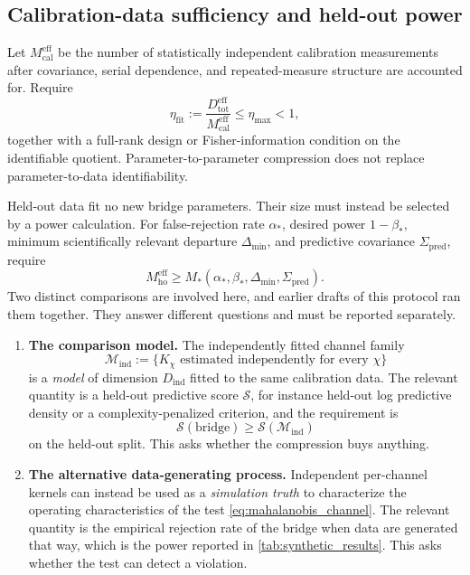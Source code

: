 \documentclass[11pt]{article}
\begin{document}
\subsection{Calibration-data sufficiency and held-out power}

Let \(M_{\mathrm{cal}}^{\mathrm{eff}}\) be the number of statistically independent calibration measurements after covariance, serial dependence, and repeated-measure structure are accounted for. Require
\begin{equation}
\eta_{\mathrm{fit}}
:=\frac{D_{\mathrm{tot}}^{\mathrm{eff}}}
        {M_{\mathrm{cal}}^{\mathrm{eff}}}
\le\eta_{\max}<1,
\label{eq:fit_ratio}
\end{equation}
together with a full-rank design or Fisher-information condition on the identifiable quotient. Parameter-to-parameter compression does not replace parameter-to-data identifiability.

Held-out data fit no new bridge parameters. Their size must instead be selected by a power calculation. For false-rejection rate \(\alpha_*\), desired power \(1-\beta_*\), minimum scientifically relevant departure \(\Delta_{\min}\), and predictive covariance \(\Sigma_{\mathrm{pred}}\), require
\begin{equation}
M_{\mathrm{ho}}^{\mathrm{eff}}
\ge
M_*(\alpha_*,\beta_*,\Delta_{\min},\Sigma_{\mathrm{pred}}).
\label{eq:power_requirement}
\end{equation}
Two distinct comparisons are involved here, and earlier drafts of this protocol ran them together. They answer different questions and must be reported separately.

\begin{enumerate}[leftmargin=1.55em]
\item \textbf{The comparison model.} The independently fitted channel family
\begin{equation}
\mathcal M_{\mathrm{ind}}
:=\{K_{\chi}\text{ estimated independently for every }\chi\}
\label{eq:independent_null}
\end{equation}
is a \emph{model} of dimension \(D_{\mathrm{ind}}\) fitted to the same calibration data. The relevant quantity is a held-out predictive score \(\mathcal S\), for instance held-out log predictive density or a complexity-penalized criterion, and the requirement is
\begin{equation}
\mathcal S\!\left(\text{bridge}\right)
\ge
\mathcal S\!\left(\mathcal M_{\mathrm{ind}}\right)
\label{eq:predictive_comparison}
\end{equation}
on the held-out split. This asks whether the compression buys anything.
\item \textbf{The alternative data-generating process.} Independent per-channel kernels can instead be used as a \emph{simulation truth} to characterize the operating characteristics of the test \cref{eq:mahalanobis_channel}. The relevant quantity is the empirical rejection rate of the bridge when data are generated that way, which is the power reported in \cref{tab:synthetic_results}. This asks whether the test can detect a violation.
\end{enumerate}
\end{document}

